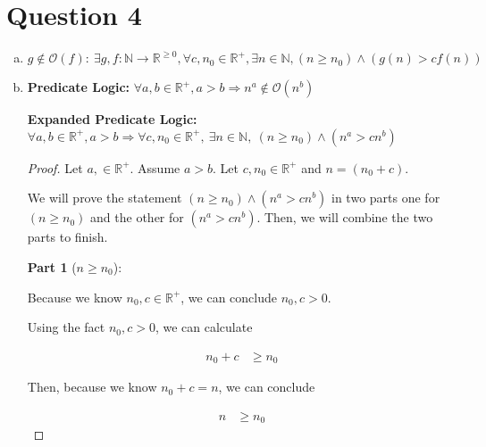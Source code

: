 \documentclass[12pt]{article}
\begin{document}
\section*{Question 4}
\begin{enumerate}[a.]
    \item
    $g \notin \mathcal{O}(f):\:\exists g,f:\mathbb{N} \to \mathbb{R}^{\geq 0},
    \forall c,n_0 \in \mathbb{R}^{+}, \exists n \in \mathbb{N}, (n \geq n_0) \land
    (g(n) > cf(n))$

    \item
    \textbf{Predicate Logic:} $\forall a,b \in \mathbb{R}^{+}, a > b \Rightarrow
    n^a \notin \mathcal{O}(n^b)$

    \bigskip

    \textbf{Expanded Predicate Logic:} $\forall a,b \in \mathbb{R}^{+}, a > b \Rightarrow
    \forall c,n_0 \in \mathbb{R}^{+},\:\exists n \in \mathbb{N},\: (n \geq n_0) \land (n^a > cn^b)$

    \bigskip

    \begin{proof}

    Let $a, \in \mathbb{R}^{+}$. Assume $a > b$. Let $c, n_0 \in \mathbb{R}^{+}$
    and $n = (n_0 + c)$.

    \bigskip

    We will prove the statement $(n \geq n_0) \land (n^a > cn^b)$ in two parts
    one for $(n \geq n_0)$ and the other for $(n^a > cn^b)$. Then, we will
    combine the two parts to finish.

    \bigskip

    \textbf{Part 1} ($n \geq n_0$):

    \bigskip

    Because we know $n_0,c \in \mathbb{R}^{+}$, we can conclude $n_0,c > 0$.

    \bigskip

    Using the fact $n_0,c > 0$, we can calculate

    \setcounter{equation}{0}
    \begin{align}
        n_0 + c &\geq n_0
    \end{align}

    \bigskip

    Then, because we know $n_0 + c = n$, we can conclude

    \begin{align}
        n &\geq n_0
    \end{align}

    \bigskip


\end{proof}
\end{enumerate}
\end{document}
